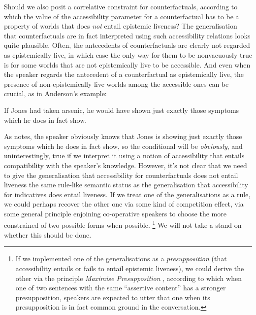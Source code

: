 \documentclass[If.tex]{subfiles}
\begin{document}
Should we also posit a correlative constraint for counterfactuals, according to which the value of the accessibility parameter for a counterfactual has to be a property of worlds that does \emph{not} entail epistemic liveness?  The generalisation that counterfactuals are in fact interpreted using such accessibility relations looks quite plausible.  Often, the antecedents of counterfactuals are clearly not regarded as epistemically live, in which case the only way for them to be nonvacuously true is for some worlds that are not epistemically live to be accessible.  And even when the speaker regards the antecedent of a counterfactual as epistemically live, the presence of non-epistemically live worlds among the accessible ones can be crucial, as in Anderson's example:
\begin{prop}
	\nitem
	If Jones had taken arsenic, he would have shown just exactly those symptoms which he does in fact show.
\end{prop}
As \citet{vonFintelPSC} notes, the speaker obviously knows that Jones is showing just exactly those symptoms which he does in fact show, so the conditional will be \emph{obviously}, and uninterestingly, true if we interpret it using a notion of accessibility that entails compatibility with the speaker's knowledge.  However, it's not clear that we need to give the generalisation that accessibility for counterfactuals does not entail liveness the same rule-like semantic status as the generalisation that accessibility for indicatives does entail liveness.  If we treat one of the generalisations as a rule, we could perhaps recover the other one via some kind of competition effect, via some general principle enjoining co-operative speakers to choose the more constrained of two possible forms when possible.%
\footnote{If we implemented one of the generalisations as a \emph{presupposition} (that accessibility entails or fails to entail epistemic liveness), we could derive the other via the principle \emph{Maximise Presupposition} \citep{HeimAD}, according to which when one of two sentences with the same “assertive content” has a stronger presupposition, speakers are expected to utter that one when its presupposition is in fact common ground in the conversation.}
We will not take a stand on whether this should be done.  
\end{document}
